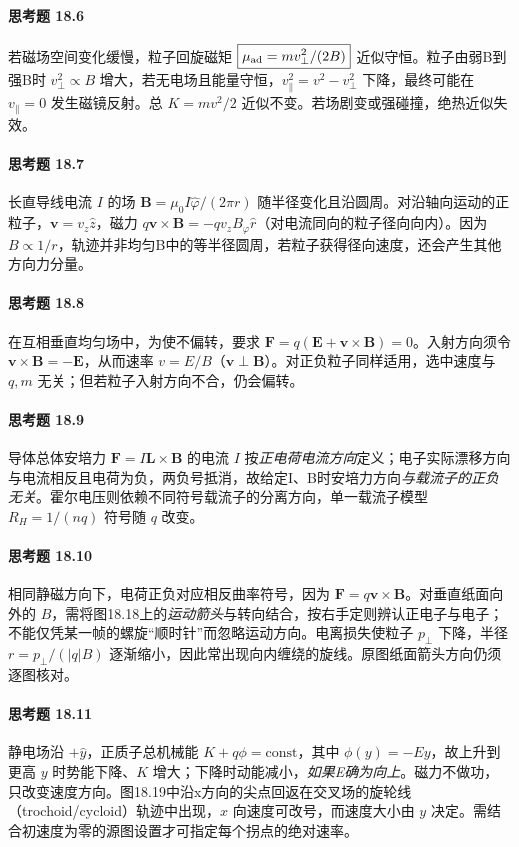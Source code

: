 \paragraph{思考题 18.6}
若磁场空间变化缓慢，粒子回旋磁矩 \(\boxed{\mu_{\rm ad}=mv_\perp^2/(2B)}\) 近似守恒。粒子由弱B到强B时 \(v_\perp^2\propto B\) 增大，若无电场且能量守恒，\(v_\parallel^2=v^2-v_\perp^2\) 下降，最终可能在 \(v_\parallel=0\) 发生磁镜反射。总 \(K=mv^2/2\) 近似不变。若场剧变或强碰撞，绝热近似失效。

\paragraph{思考题 18.7}
长直导线电流 \(I\) 的场 \(\boldsymbol B=\mu_0I\hat\varphi/(2\pi r)\) 随半径变化且沿圆周。对沿轴向运动的正粒子，\(\boldsymbol v=v_z\hat z\)，磁力 \(q\boldsymbol v\times\boldsymbol B=-qv_z B_\varphi\hat r\)（对电流同向的粒子径向向内）。因为 \(B\propto1/r\)，轨迹并非均匀B中的等半径圆周，若粒子获得径向速度，还会产生其他方向力分量。

\paragraph{思考题 18.8}
在互相垂直均匀场中，为使不偏转，要求 \(\boldsymbol F=q(\boldsymbol E+\boldsymbol v\times\boldsymbol B)=0\)。入射方向须令 \(\boldsymbol v\times\boldsymbol B=-\boldsymbol E\)，从而速率 \(\boxed{v=E/B}\)（\(\boldsymbol v\perp\boldsymbol B\)）。对正负粒子同样适用，选中速度与 \(q,m\) 无关；但若粒子入射方向不合，仍会偏转。

\paragraph{思考题 18.9}
导体总体安培力 \(\boldsymbol F=I\boldsymbol L\times\boldsymbol B\) 的电流 \(I\) 按\emph{正电荷电流方向}定义；电子实际漂移方向与电流相反且电荷为负，两负号抵消，故给定I、B时安培力方向\emph{与载流子的正负无关}。霍尔电压则依赖不同符号载流子的分离方向，单一载流子模型 \(R_H=1/(nq)\) 符号随 \(q\) 改变。

\paragraph{思考题 18.10}
相同静磁方向下，电荷正负对应相反曲率符号，因为 \(\boldsymbol F=q\boldsymbol v\times\boldsymbol B\)。对垂直纸面向外的 \(B\)，需将图18.18上的\emph{运动箭头}与转向结合，按右手定则辨认正电子与电子；不能仅凭某一帧的螺旋“顺时针”而忽略运动方向。电离损失使粒子 \(p_\perp\) 下降，半径 \(r=p_\perp/(|q|B)\) 逐渐缩小，因此常出现向内缠绕的旋线。原图纸面箭头方向仍须逐图核对。

\paragraph{思考题 18.11}
静电场沿 \(+\hat y\)，正质子总机械能 \(\boxed{K+q\phi=\mathrm{const}}\)，其中 \(\phi(y)=-Ey\)，故上升到更高 \(y\) 时势能下降、\(\boxed{K\text{ 增大}}\)；下降时动能减小，\emph{如果E确为向上}。磁力不做功，只改变速度方向。图18.19中沿x方向的尖点回返在交叉场的旋轮线（trochoid/cycloid）轨迹中出现，\(x\) 向速度可改号，而速度大小由 \(y\) 决定。需结合初速度为零的源图设置才可指定每个拐点的绝对速率。
